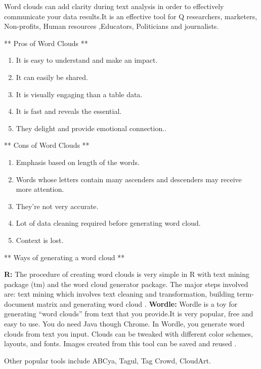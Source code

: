 \documentclass[]{book}
\providecommand{\tightlist}{%
  \setlength{\itemsep}{0pt}\setlength{\parskip}{0pt}}
\theoremstyle{definition}
\theoremstyle{definition}
\theoremstyle{definition}
\theoremstyle{remark}
\begin{document}
Word clouds can add clarity during text analysis in order to effectively
communicate your data results.It is an effective tool for Q researchers,
marketers, Non-profits, Human resources ,Educators, Politicians and
journalists.

** Pros of Word Clouds **

\begin{enumerate}
\def\labelenumi{\arabic{enumi}.}
\tightlist
\item
  It is easy to understand and make an impact.
\item
  It can easily be shared.
\item
  It is visually engaging than a table data.
\item
  It is fast and reveals the essential.
\item
  They delight and provide emotional connection..
\end{enumerate}

** Cons of Word Clouds **

\begin{enumerate}
\def\labelenumi{\arabic{enumi}.}
\tightlist
\item
  Emphasis based on length of the words.
\item
  Words whose letters contain many ascenders and descenders may receive
  more attention.
\item
  They're not very accurate.
\item
  Lot of data cleaning required before generating word cloud.
\item
  Context is lost.
\end{enumerate}

\citep{wordcloud}

** Ways of generating a word cloud **

\textbf{R:} The procedure of creating word clouds is very simple in R
with text mining package (tm) and the word cloud generator package. The
major steps involved are: text mining which involves text cleaning and
transformation, building term-document matrix and generating word cloud
\citep{r}. \textbf{Wordle:} Wordle is a toy for generating ``word
clouds'' from text that you provide.It is very popular, free and easy to
use. You do need Java though Chrome. In Wordle, you generate word clouds
from text you input. Clouds can be tweaked with different color schemes,
layouts, and fonts. Images created from this tool can be saved and
reused \citep{wordle}.

Other popular tools include ABCya, Tagul, Tag Crowd, CloudArt.
\end{document}
